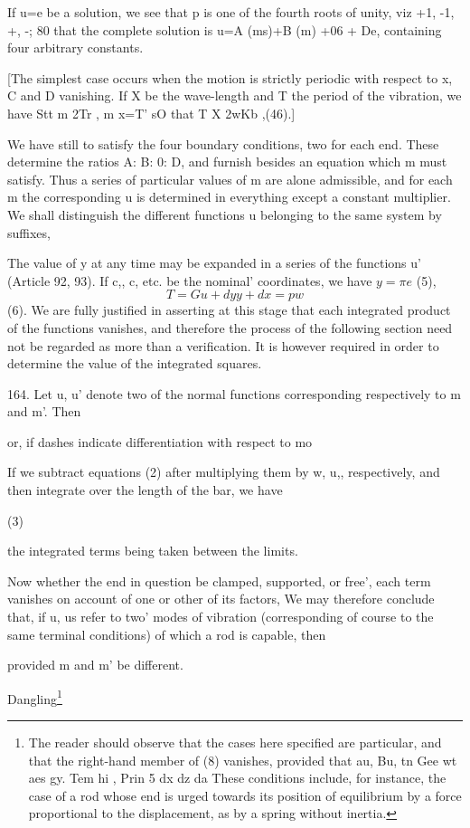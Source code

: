 If u=e be a solution, we see that p is one of the fourth roots of unity,
viz +1, -1, +, -; 80 that the complete solution is
u=A (ms)+B (m) +06 + De,
containing four arbitrary constants.

[The simplest case occurs when the motion is strictly periodic
with respect to x, C and D vanishing. If X be the wave-length
and T the period of the vibration, we have
Stt m 2Tr , m x=T'
sO that
T X 2wKb ,(46).]


We have still to satisfy the four boundary conditions, two for each end.
These determine the ratios A: B: 0: D, and furnish besides an equation
which m must satisfy. Thus a series of particular values of m are alone
admissible, and for each m the corresponding u is determined in
everything except a constant multiplier. We shall distinguish the
different functions u belonging to the same system by suffixes,

The value of y at any time may be expanded in a series of the functions
u' (Article 92, 93). If c,, c, etc. be the nominal' coordinates, we have
\(y= \pi e\) (5),
\[ T=  G u + dy y + dx = pw \]
(6). We are fully justified in asserting at this stage that each
integrated product of the functions vanishes, and therefore the process
of the following section need not be regarded as more than a
verification. It is however required in order to determine the value of
the integrated squares.

164. Let u, u' denote two of the normal functions corresponding
respectively to m and m'. Then

or, if dashes indicate differentiation with respect to mo

If we subtract equations (2) after multiplying them by w, u,,
respectively, and then integrate over the length of the bar, we have

(3)

the integrated terms being taken between the limits.

Now whether the end in question be clamped, supported, or free', each
term vanishes on account of one or other of its factors, We may
therefore conclude that, if u, us refer to two' modes of vibration
(corresponding of course to the same terminal conditions) of which a rod
is capable, then

provided m and m' be different.


Dangling\footnote{ The reader should observe that the cases here specified are
particular, and that the right-hand member of (8) vanishes, provided
that au, Bu, tn Gee wt aes gy. Tem hi , Prin 5 dx dz da These conditions
include, for instance, the case of a rod whose end is urged
towards its position of equilibrium by a force proportional to the
displacement, as by a spring without inertia.}

